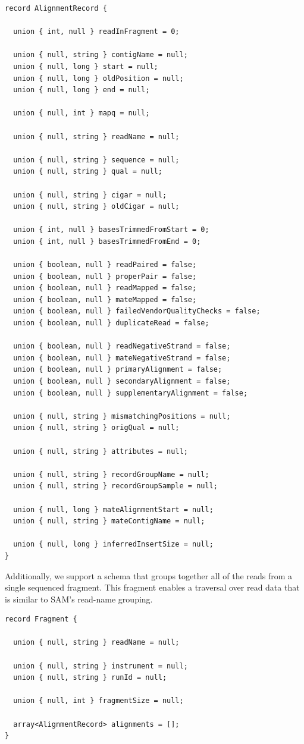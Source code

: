 \documentclass[phd]{ucbthesis}
\begin{document}
\begin{lstlisting}[caption=\textsc{ADAM} read schema]
record AlignmentRecord {
 
  union { int, null } readInFragment = 0;

  union { null, string } contigName = null;
  union { null, long } start = null;
  union { null, long } oldPosition = null;
  union { null, long } end = null;

  union { null, int } mapq = null;

  union { null, string } readName = null;

  union { null, string } sequence = null;
  union { null, string } qual = null;

  union { null, string } cigar = null;
  union { null, string } oldCigar = null;

  union { int, null } basesTrimmedFromStart = 0;
  union { int, null } basesTrimmedFromEnd = 0;

  union { boolean, null } readPaired = false;
  union { boolean, null } properPair = false;
  union { boolean, null } readMapped = false;
  union { boolean, null } mateMapped = false;
  union { boolean, null } failedVendorQualityChecks = false;
  union { boolean, null } duplicateRead = false;

  union { boolean, null } readNegativeStrand = false;
  union { boolean, null } mateNegativeStrand = false;
  union { boolean, null } primaryAlignment = false;
  union { boolean, null } secondaryAlignment = false;
  union { boolean, null } supplementaryAlignment = false;

  union { null, string } mismatchingPositions = null;
  union { null, string } origQual = null;

  union { null, string } attributes = null;

  union { null, string } recordGroupName = null;
  union { null, string } recordGroupSample = null;

  union { null, long } mateAlignmentStart = null;
  union { null, string } mateContigName = null;

  union { null, long } inferredInsertSize = null;
}
\end{lstlisting}

Additionally, we support a schema that groups together all of the reads from a
single sequenced fragment. This fragment enables a traversal over read data that
is similar to \textsc{SAM}'s read-name grouping.

\begin{lstlisting}[caption=\textsc{ADAM} fragment schema]
record Fragment {

  union { null, string } readName = null;

  union { null, string } instrument = null;
  union { null, string } runId = null;

  union { null, int } fragmentSize = null;

  array<AlignmentRecord> alignments = [];
}
\end{lstlisting}
\end{document}

